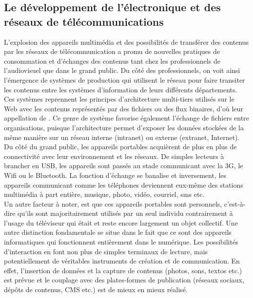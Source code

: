 

\subsection{Le développement de l'électronique et des réseaux de télécommunications}\label{sec:electro}
L’explosion des appareils multimédia et des possibilités de transférer des contenus par les réseaux de télécommunication a promu de nouvelles pratiques de consommation et d'échanges des contenus tant chez les professionnels de l'audiovisuel que dans le grand public.
% 
Du côté des professionnels, on voit ainsi l’émergence de systèmes de production qui utilisent le réseau pour faire transiter les contenus entre les systèmes d'information de leurs différents départements. 
Ces systèmes reprennent les principes d'architecture multi-tiers utilisés sur le Web avec les contenus représentés par des fichiers ou des flux binaires, d'où leur appellation de .
% 
Ce genre de système favorise également l’échange de fichiers entre organisations, puisque l’architecture permet d'exposer les données stockées de la même manière sur un réseau interne (intranet) ou externe (extranet, Internet).
% 
Du côté du grand public, les appareils portables acquièrent de plus en plus de connectivité avec leur environnement et les réseaux. 
De simples lecteurs à brancher en USB, les appareils sont passés au stade communicant avec la 3G, le Wifi ou le Bluetooth. 
La fonction d'échange se banalise et inversement, les appareils communicant comme les téléphones deviennent eux-même des stations multimédia à part entière, musique, photo, vidéo, courriel, sms etc.\\


Un autre facteur à noter, est que ces appareils portables sont personnels, c’est-à-dire qu’ils sont majoritairement utilisés par un seul individu contrairement à l’usage du téléviseur qui était et reste encore largement un objet collectif. 
Une autre distinction fondamentale se situe dans le fait que ce sont des appareils informatiques qui fonctionnent entièrement dans le numérique. 
Les possibilités d’interaction en font non plus de simples terminaux de lecture, mais potentiellement de véritables instruments de création et de communication. En effet, l'insertion de données et la capture de contenus (photos, sons, textos etc.) est prévue et le couplage avec des plates-formes de publication (réseaux sociaux, dépôts de contenus, CMS etc.) est de mieux en mieux réalisé.

